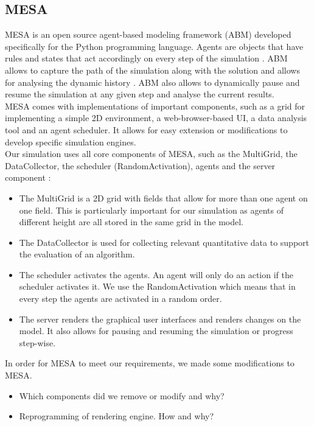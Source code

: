 \subsection{MESA}
MESA \cite{masad.2015} is an open source agent-based modeling framework (ABM) developed specifically for the Python programming language.  Agents are objects that have rules and states that act accordingly on every step of the simulation \cite{axtell.2000}. ABM allows to capture the path of the simulation along with the solution and allows for analysing the dynamic history \cite{axtell.2000}. ABM also allows to dynamically pause and resume the simulation at any given step and analyse the current results.\\
MESA comes with implementations of important components, such as a grid for implementing a simple 2D environment, a web-browser-based UI, a data analysis tool and an agent scheduler. It allows for easy extension or modifications to develop specific simulation engines. \\
Our simulation uses all core components of MESA, such as the MultiGrid, the DataCollector, the scheduler (RandomActivation), agents and the server component \cite{masad.2015}:
\begin{itemize}
	\item The MultiGrid is a 2D grid with fields that allow for more than one agent on one field. This is particularly important for our simulation as agents of different height are all stored in the same grid in the model.
	\item The DataCollector is used for collecting relevant quantitative data to support the evaluation of an algorithm.
	\item The scheduler activates the agents. An agent will only do an action if the scheduler activates it. We use the RandomActivation which means that in every step the agents are activated in a random order.
	\item The server renders the graphical user interfaces and renders changes on the model. It also allows for pausing and resuming the simulation or progress step-wise. 
\end{itemize} 
In order for MESA to meet our requirements, we made some modifications to MESA. 


\begin{itemize}
	\item Which components did we remove or modify and why?
	\item Reprogramming of rendering engine. How and why?
\end{itemize}


